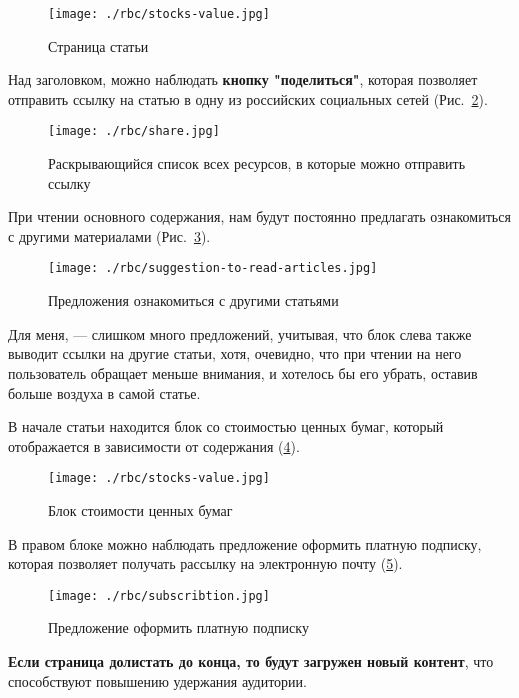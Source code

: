 \begin{figure}[!ht]
    \centering
      \texttt{[image: ./rbc/stocks-value.jpg]}
      \caption{Страница статьи}
    \label{articlePage}
\end{figure}

Над заголовком, можно наблюдать \textbf{кнопку "поделиться"}, которая позволяет отправить ссылку на статью в одну из российских социальных сетей (Рис.~\ref{share}).

\begin{figure}[!ht]
  \centering
    \texttt{[image: ./rbc/share.jpg]}
    \caption{Раскрывающийся список всех ресурсов, в которые можно отправить ссылку}
  \label{share}
\end{figure}

При чтении основного содержания, нам будут постоянно предлагать ознакомиться с другими материалами (Рис.~\ref{suggestions}).

\begin{figure}[!ht]
  \centering
    \texttt{[image: ./rbc/suggestion-to-read-articles.jpg]}
    \caption{Предложения ознакомиться с другими статьями}
  \label{suggestions}
\end{figure}

Для меня, --- слишком много предложений, учитывая, что блок слева также выводит ссылки на другие статьи, хотя, очевидно, что при чтении на него пользователь обращает меньше внимания, и хотелось бы его убрать, оставив больше воздуха в самой статье.

В начале статьи находится блок со стоимостью ценных бумаг, который отображается в зависимости от содержания (\ref{stocks-value}).

\begin{figure}[!ht]
  \centering
    \texttt{[image: ./rbc/stocks-value.jpg]}
    \caption{Блок стоимости ценных бумаг}
  \label{stocks-value}
\end{figure}

В правом блоке можно наблюдать предложение оформить платную подписку, которая позволяет получать рассылку на электронную почту (\ref{subscription}).

\begin{figure}[!ht]
  \centering
    \texttt{[image: ./rbc/subscribtion.jpg]}
    \caption{Предложение оформить платную подписку}
  \label{subscription}
\end{figure}

\textbf{Если страница долистать до конца, то будут загружен новый контент}, что способствуют повышению удержания аудитории.


